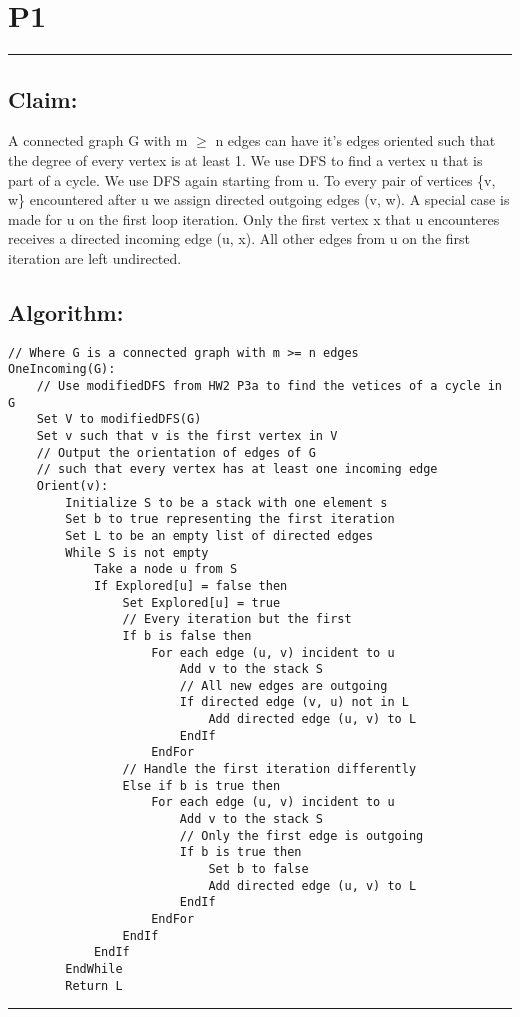 \documentclass[11pt]{article}
\title{}
\author{}
\date{}
\begin{document}
\section*{P1}

\noindent\textcolor[RGB]{220,220,220}{\rule{\linewidth}{0.8pt}}

\subsection*{Claim:} 
A connected graph G with m $\geq$ n edges can have it's edges oriented such that the degree of every vertex is at least 1. We use DFS to find a vertex u that is part of a cycle. We use DFS again starting from u. To every pair of vertices \{v, w\} encountered after u we assign directed outgoing edges (v, w). A special case is made for u on the first loop iteration. Only the first vertex x that u encounteres receives a directed incoming edge (u, x). All other edges from u on the first iteration are left undirected.

\subsection*{Algorithm:} 
\begin{lstlisting}[basicstyle=\small]
// Where G is a connected graph with m >= n edges
OneIncoming(G):
	// Use modifiedDFS from HW2 P3a to find the vetices of a cycle in G
	Set V to modifiedDFS(G)
	Set v such that v is the first vertex in V
	// Output the orientation of edges of G
	// such that every vertex has at least one incoming edge
	Orient(v):
		Initialize S to be a stack with one element s
		Set b to true representing the first iteration
		Set L to be an empty list of directed edges
		While S is not empty
			Take a node u from S
			If Explored[u] = false then
				Set Explored[u] = true
				// Every iteration but the first
				If b is false then 
					For each edge (u, v) incident to u
						Add v to the stack S
						// All new edges are outgoing
						If directed edge (v, u) not in L 
							Add directed edge (u, v) to L
						EndIf
					EndFor
				// Handle the first iteration differently
				Else if b is true then
					For each edge (u, v) incident to u
						Add v to the stack S
						// Only the first edge is outgoing
						If b is true then 
							Set b to false
							Add directed edge (u, v) to L
						EndIf
					EndFor
				EndIf
			EndIf
		EndWhile
		Return L
\end{lstlisting}

\noindent\textcolor[RGB]{220,220,220}{\rule{\linewidth}{0.8pt}}
\linebreak
\end{document}
